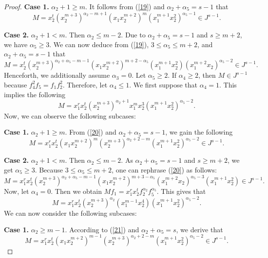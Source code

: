 \documentclass[11pt]{amsart}
\begin{document}
\begin{proof}
  \textbf{Case 1.}    $\alpha_2+1\geq m$.  It follows from (\ref{19}) and   $\alpha_2+\alpha_5=s-1$ that 
  $$M=x_2^t (x_2^{m+3})^{\alpha_2-m+1} (x_1x_2^{m+2})^m  (x_1^{m+1}x_2^2)^{\alpha_5-1}\in J^{s-1}.$$

\textbf{Case 2.}  $\alpha_2+1 < m$.  Then $\alpha_2\leq m-2$. Due to   $\alpha_2+\alpha_5=s-1$ and $s\geq m+2$, we have   $\alpha_5\geq 3$. 
 We can now deduce  from (\ref{19}),   $3\leq \alpha_5 \leq m+2$, and $\alpha_2+\alpha_5=s-1$ that 
    $$M= x_2^t(x_2^{m+3})^{\alpha_2+\alpha_5-m-1} (x_1x_2^{m+2})^{m+2-\alpha_5} 
       (x_1^{m+1}x_2^2) (x_1^{m+2} x_2)^{\alpha_5-2}\in J^{s-1}.$$ 
  Henceforth, we additionally  assume  $\alpha_3=0$. 
 Let  $\alpha_5 \geq 2$. If $\alpha_4\geq 2$,  then $M\in J^{s-1}$ because  $f_4^{2}f_5=f_1f_2^{2}$. Therefore, let   $\alpha_4 \leq 1$. 
  We first  suppose that   $\alpha_4=1$.     This implies the following  
 \begin{equation} \label{20}
   M=x_1^rx^t_2(x_2^{m+3})^{\alpha_2 +1} x_1^m x_2^3 (x_1^{m+1}x_2^2)^{\alpha_5-2}.
   \end{equation} 
  Now, we can observe  the following subcases:
   
   \textbf{Case 1.}    $\alpha_2+1\geq m$. From  (\ref{20})   and    $\alpha_2+\alpha_5=s-1$, we gain the following  
$$M=x_1^rx^t_2(x_1x_2^{m+2})^m  (x_2^{m+3})^{\alpha_2+2-m} (x_1^{m+1}x_2^2)^{\alpha_5-2} \in J^{s-1}.$$

\textbf{Case 2.}  $\alpha_2+1 < m$.   Then $\alpha_2\leq m-2$. As  $\alpha_2+\alpha_5=s-1$ and $s\geq m+2$, we get  $\alpha_5\geq 3$. 
 Because  $3\leq \alpha_5 \leq m+2$, one can rephrase  (\ref{20}) as follows:
      $$M= x_1^rx_2^t(x_2^{m+3})^{\alpha_2+\alpha_5-m-1} (x_1x_2^{m+2})^{m+3-\alpha_5} 
       (x_1^{m+2}x_2)^{\alpha_5-3} (x_1^{m+1}x_2^2)\in J^{s-1}.$$    
       Now, let $\alpha_4=0$.  Then we obtain  $Mf_1=x_1^rx^t_2 f_2^{\alpha_2}f_5^{\alpha_5}.$ This gives that     
    \begin{equation} \label{21}
   M=x_1^rx^t_2 (x_2^{m+3})^{\alpha_2} (x_1^{m-1} x_2^4) (x_1^{m+1}x_2^2)^{\alpha_5-2}.
     \end{equation}
     We can now  consider the following subcases:
   
\textbf{Case 1.}    $\alpha_2\geq m-1$. According to  (\ref{21}) and $\alpha_2+\alpha_5=s$, we derive that   
$$M=x_1^r x^t_2(x_1x_2^{m+2})^{m-1}  (x_2^{m+3})^{\alpha_2+2-m} (x_1^{m+1}x_2^2)^{\alpha_5-2} \in J^{s-1}.$$


\end{proof}
\end{document}
